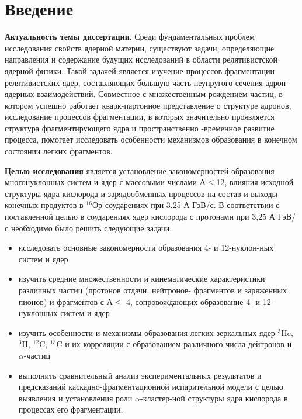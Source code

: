 \documentclass[fontsize=14pt]{scrreport}
\begin{document}
\section*{Введение}
\hspace{0.6cm}
\textbf{Актуальность темы диссертации}. Среди фундаментальных проблем исследования свойств ядерной материи, существуют задачи, определяющие направления и содержание будущих исследований в области релятивистской ядерной физики. Такой задачей является изучение процессов фрагментации  релятивистских ядер, составляющих большую часть неупругого сечения адрон-ядерных взаимодействий. Совместное с множественным рождением частиц, в котором успешно работает кварк-партонное представление о структуре адронов, исследование процессов фрагментации, в которых значительно проявляется структура фрагментирующего ядра и пространственно -временное развитие процесса, помогает исследовать особенности механизмов образования в конечном состоянии легких фрагментов.

\textbf{Целью исследования}  является установление закономерностей образования многонуклонных систем и ядер с массовыми числами А$\le$12, влияния исходной структуры ядра кислорода и зарядообменных процессов на состав и выходы конечных продуктов в $^{16}$Ор-соударениях при 3.25 А ГэВ/с. В соответствии с поставленной целью в соударениях ядер кислорода с протонами при 3,25 А ГэВ/с необходимо было решить следующие задачи:
\begin{spacing}{1.3}
\begin{itemize}
    \item исследовать основные закономерности образования 4- и 12-нуклон-ных систем и ядер
    \item изучить средние множественности и кинематические характеристики различных частиц (протонов отдачи, нейтронов- фрагментов и заряженных пионов) и фрагментов с А$\le$ 4, сопровождающих образование 4- и 12- нуклонных систем и ядер
    \item изучить особенности и механизмы образования легких зеркальных ядер $^{3}$He, $^{3}$H, $^{12}$C, $^{13}$C и их корреляции с образованием различного числа дейтронов и $\alpha$-частиц
    \item выполнить сравнительный анализ экспериментальных результатов и предсказаний каскадно-фрагментационной испарительной модели с целью выявления и установления роли $\alpha$-кластер-ной структуры ядра кислорода в процессах его фрагментации.
\end{itemize}
\end{spacing}
\end{document}
